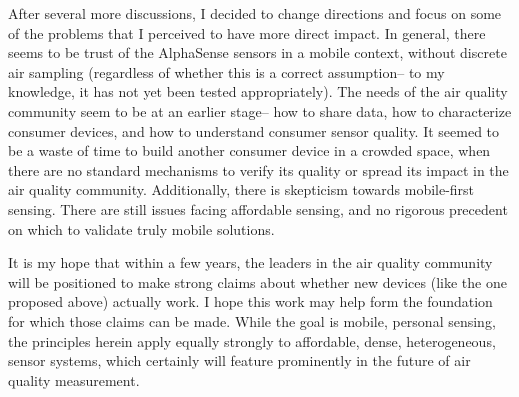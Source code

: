After several more discussions, I decided to change directions and focus on some of the problems that I perceived to have more direct impact.  In general, there seems to be trust of the AlphaSense sensors in a mobile context, without discrete air sampling (regardless of whether this is a correct assumption-- to my knowledge, it has not yet been tested appropriately).  The needs of the air quality community seem to be at an earlier stage-- how to share data, how to characterize consumer devices, and how to understand consumer sensor quality.  It seemed to be a waste of time to build another consumer device in a crowded space, when there are no standard mechanisms to verify its quality or spread its impact in the air quality community.  Additionally, there is skepticism towards mobile-first sensing.  There are still issues facing affordable  sensing, and no rigorous precedent on which to validate truly mobile solutions.

It is my hope that within a few years, the leaders in the air quality community will be positioned to make strong claims about whether new devices (like the one proposed above) actually work.  I hope this work may help form the foundation for which those claims can be made.  While the goal is mobile, personal sensing, the principles herein apply equally strongly to affordable, dense, heterogeneous, sensor systems, which certainly will feature prominently in the future of air quality measurement. 

\clearpage
\newpage
